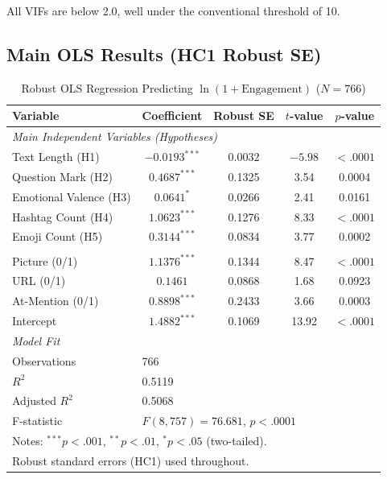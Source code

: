 \documentclass[12pt,a4paper]{article}
\begin{document}
All VIFs are below 2.0, well under the conventional threshold of 10.

\subsection{Main OLS Results (HC1 Robust SE)}

\begin{table}[H]
\centering
\caption{Robust OLS Regression Predicting $\ln(1+\text{Engagement})$ ($N=766$)}
\label{tab:regression_main}
\small
\begin{tabular}{lcccc}
\toprule
Variable & Coefficient & Robust SE & $t$-value & $p$-value \\
\midrule
\multicolumn{5}{l}{\textit{Main Independent Variables (Hypotheses)}} \\
Text Length (H1) & $-0.0193^{***}$ & 0.0032 & $-5.98$ & $<.0001$ \\
Question Mark (H2) & $0.4687^{***}$ & 0.1325 & 3.54 & 0.0004 \\
Emotional Valence (H3) & $0.0641^{*}$ & 0.0266 & 2.41 & 0.0161 \\
Hashtag Count (H4) & $1.0623^{***}$ & 0.1276 & 8.33 & $<.0001$ \\
Emoji Count (H5) & $0.3144^{***}$ & 0.0834 & 3.77 & 0.0002 \\
\addlinespace
\multicolumn{5}{l}{\textit{Control Variables (binary dummies)}} \\
Picture (0/1) & $1.1376^{***}$ & 0.1344 & 8.47 & $<.0001$ \\
URL (0/1) & $0.1461$ & 0.0868 & 1.68 & 0.0923 \\
At-Mention (0/1) & $0.8898^{***}$ & 0.2433 & 3.66 & 0.0003 \\
\addlinespace
Intercept & $1.4882^{***}$ & 0.1069 & 13.92 & $<.0001$ \\
\midrule
\multicolumn{5}{l}{\textit{Model Fit}} \\
Observations & \multicolumn{4}{l}{766} \\
$R^2$ & \multicolumn{4}{l}{0.5119} \\
Adjusted $R^2$ & \multicolumn{4}{l}{0.5068} \\
F-statistic & \multicolumn{4}{l}{$F(8, 757) = 76.681$, $p<.0001$} \\
\bottomrule
\multicolumn{5}{l}{\small Notes: $^{***}p<.001$, $^{**}p<.01$, $^{*}p<.05$ (two-tailed).} \\
\multicolumn{5}{l}{\small Robust standard errors (HC1) used throughout.} \\
\end{tabular}
\end{table}
\end{document}
